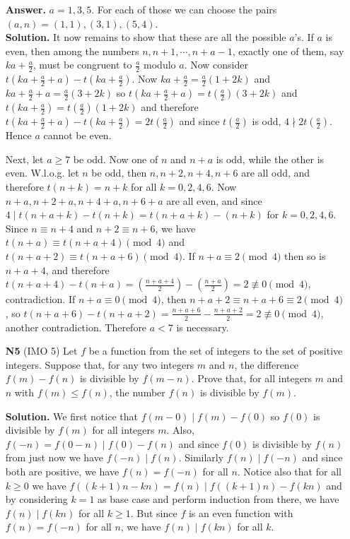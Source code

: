 \documentclass[11pt,a4paper]{article}
\begin{document}
\begin{enumerate}
	\textbf{Answer.} $a=1, 3, 5$. For each of those we can choose the pairs $(a, n)=(1, 1), (3, 1), (5,4)$. \\
	\textbf{Solution.} It now remains to show that these are all the possible $a$'s. If $a$ is even, then among the numbers $n, n+1, \cdots , n+a-1$, exactly one of them, say $ka+\frac{a}{2}$, must be congruent to $\frac{a}{2}$ modulo $a$. Now consider $t(ka+\frac{a}{2}+a)-t(ka+\frac{a}{2})$. 
	Now $ka+\frac{a}{2}=\frac{a}{2}(1+2k)$ and $ka+\frac{a}{2}+a=\frac{a}{2}(3+2k)$ so $t(ka+\frac{a}{2}+a)=t(\frac{a}{2})(3+2k)$ and $t(ka+\frac{a}{2})=t(\frac{a}{2})(1+2k)$ and therefore 
	$t(ka+\frac{a}{2}+a)-t(ka+\frac{a}{2})=2t(\frac{a}{2})$ and since $t(\frac{a}{2})$ is odd, $4\nmid 2t(\frac{a}{2})$. Hence $a$ cannot be even. 
	
	Next, let $a\ge 7$ be odd. Now one of $n$ and $n+a$ is odd, while the other is even. W.l.o.g. let $n$ be odd, then $n, n+2, n+4, n+6$ are all odd, and therefore $t(n+k)=n+k$ for all $k=0, 2, 4, 6$. 
	Now $n+a, n+2+a, n+4+a, n+6+a$ are all even, and since $4\mid t(n+a+k)-t(n+k)=t(n+a+k)-(n+k)$ for $k=0, 2, 4, 6$. Since $n\equiv n+4$ and $n+2\equiv n+6$, we have $t(n+a)\equiv t(n+a+4)\pmod{4}$ and $t(n+a+2)\equiv t(n+a+6)\pmod{4}$. If $n+a\equiv 2\pmod{4}$ then so is $n+a+4$, and therefore $t(n+a+4)-t(n+a)=(\frac{n+a+4}{2})-(\frac{n+a}{2})=2\not\equiv 0\pmod{4}$, contradiction. 
	If $n+a\equiv 0\pmod{4}$, then $n+a+2\equiv n+a+6\equiv 2\pmod{4}$, so $t(n+a+6)-t(n+a+2)=\frac{n+a+6}{2}-\frac{n+a+2}{2}=2\not\equiv 0\pmod{4}$, another contradiction. Therefore $a<7$ is necessary. 
	
	\item[\textbf{N5}] (IMO 5) Let $f$ be a function from the set of integers to the set of positive integers. Suppose that, for any two integers $m$ and $n$, the difference $f(m) - f(n)$ is divisible by $f(m- n)$. Prove that, for all integers $m$ and $n$ with $f(m) \leq f(n)$, the number $f(n)$ is divisible by $f(m)$.
	
	\textbf{Solution.} We first notice that $f(m-0)\mid f(m)-f(0)$ so $f(0)$ is divisible by $f(m)$ for all integers $m$. Also, $f(-n)=f(0-n)\mid f(0)-f(n)$ and since $f(0)$ is divisible by $f(n)$ from just now we have $f(-n)\mid f(n)$. Similarly $f(n)\mid f(-n)$ and since both are positive, we have $f(n)=f(-n)$ for all $n$. Notice also that for all $k\ge 0$ we have $f((k+1)n - kn) = f(n)\mid f((k+1)n) - f(kn)$ and by considering $k=1$ as base case and perform induction from there, we have $f(n)\mid f(kn)$ for all $k\ge 1$. But since $f$ is an even function with $f(n)=f(-n)$ for all $n$, we have $f(n)\mid f(kn)$ for all $k$. 
	

\end{enumerate}
\end{document}
